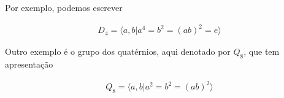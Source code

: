 \documentclass[a4paper,portuguese,11pt,twoside, leqno]{book}
\theoremstyle{definition}
\newtheorem{example}{Exemplo}[section]
\begin{document}
	
	
	
	
	
	
	\par\vspace{0.3cm} Por exemplo, podemos escrever 
	
	\begin{align}
	D_4 = \langle a,b | a^4 = b^2 = (ab)^2 = e \rangle
	\label{apresentacao d4}
	\end{align}
	
	
	
	
	\par\vspace{0.3cm} Outro exemplo é o grupo dos quatérnios, aqui denotado por $Q_8$, que tem apresentação
	
	\begin{align}
	Q_8 = \langle a,b| a^2=b^2=(ab)^2 \rangle
	\label{apresentacao quaternios}
	\end{align}
	
\end{document}
